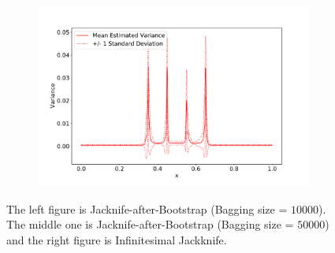\documentclass[11pt]{article}
\begin{document}
\begin{figure}[htbp]
\begin{subfigure}[b]{0.32\textwidth}
		\caption{}
		\label{fig:figeure2J_50k}
	\end{subfigure}%
	\begin{subfigure}[b]{0.32\textwidth}
		\centering	
	\includegraphics[width=1\textwidth]{../figures/figure2_IJ.pdf}
	\caption{}
	\label{fig:figeure2IJ}
	\end{subfigure}
	\caption{The left figure is Jacknife-after-Bootstrap (Bagging size  = $10000$). The middle one is Jacknife-after-Bootstrap (Bagging size  = $50000$) and the right figure is 
	Infinitesimal Jackknife.}
\end{figure}
\end{document}
